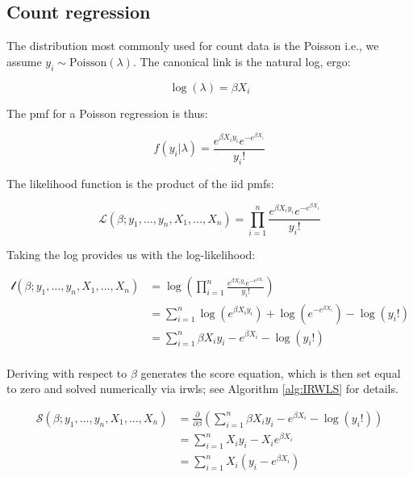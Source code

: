 \documentclass{report}
\begin{document}
\subsection{Count regression}

The distribution most commonly used for count data is the Poisson i.e., we assume $y_i \sim \text{Poisson}(\lambda)$. The canonical link is the natural log, ergo:

\begin{equation}\label{eq:glm-poisson-canonical-link}
    \log(\lambda) = \beta X_i
\end{equation}

The \gls{pmf} for a Poisson regression is thus:

\begin{equation}\label{eq:glm-poisson-resp-dist}
    f(y_i|\lambda) = \frac{e^{\beta X_iy_i}e^{-e^{\beta X_i}}}{y_i!}
\end{equation}

The likelihood function is the product of the \gls{iid} \glspl{pmf}:

\begin{equation}\label{eq:glm-poisson-likelihood}
    \mathcal{L}(\beta; y_1, \dots, y_n, X_1, \dots, X_n) = \prod_{i=1}^n \frac{e^{\beta X_iy_i}e^{-e^{\beta X_i}}}{y_i!}
\end{equation}

Taking the log provides us with the log-likelihood:

\begin{equation}\label{eq:glm-poisson-loglik}
    \begin{aligned}
        \mathcal{l}(\beta; y_1, \dots, y_n, X_1, \dots, X_n)
          &= \log\left(\prod_{i=1}^n \frac{e^{\beta X_iy_i}e^{-e^{\beta X_i}}}{y_i!}\right) \\
          &= \sum_{i=1}^n \log\left(e^{\beta X_iy_i}\right) + \log\left(e^{-e^{\beta X_i}}\right) - \log(y_i!) \\
          &= \sum_{i=1}^n \beta X_iy_i - e^{\beta X_i} - \log(y_i!) \\
    \end{aligned}
\end{equation}

Deriving with respect to $\beta$ generates the score equation, which is then set equal to zero and solved numerically via \gls{irwls}; see Algorithm \ref{alg:IRWLS} for details. 

\begin{equation}\label{eq:glm-poisson-score-equation}
    \begin{aligned}
        \mathcal{S}(\beta; y_1, \dots, y_n, X_1, \dots, X_n)
          &= \frac{\partial}{\partial\beta} \left(\sum_{i=1}^n \beta X_iy_i - e^{\beta X_i} - \log(y_i!)\right) \\
          &= \sum_{i=1}^n X_iy_i -X_ie^{\beta X_i} \\
          &= \sum_{i=1}^n X_i \left(y_i - e^{\beta X_i}\right) \\
    \end{aligned}
\end{equation}
\end{document}
